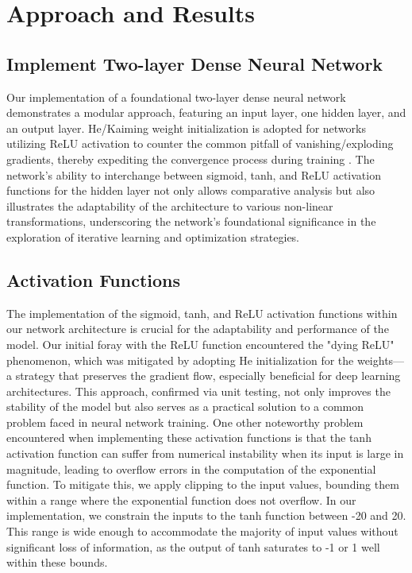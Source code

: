 \documentclass[letterpaper]{article}
\begin{document}
\section{Approach and Results}

\subsection{Implement Two-layer Dense Neural Network}
\label{subsec:twolayerdense}
Our implementation of a foundational two-layer dense neural network demonstrates a modular approach, featuring an input layer, one hidden layer, and an output layer. He/Kaiming weight initialization is adopted for networks utilizing ReLU activation to counter the common pitfall of vanishing/exploding gradients, thereby expediting the convergence process during training \cite{he2015delving}. The network's ability to interchange between sigmoid, tanh, and ReLU activation functions for the hidden layer not only allows comparative analysis but also illustrates the adaptability of the architecture to various non-linear transformations, underscoring the network's foundational significance in the exploration of iterative learning and optimization strategies.

\subsection{Activation Functions}
\label{subsec:activationfunctions}
The implementation of the sigmoid, tanh, and ReLU activation functions within our network architecture is crucial for the adaptability and performance of the model. Our initial foray with the ReLU function encountered the "dying ReLU" phenomenon, which was mitigated by adopting He initialization for the weights—a strategy that preserves the gradient flow, especially beneficial for deep learning architectures. This approach, confirmed via unit testing, not only improves the stability of the model but also serves as a practical solution to a common problem faced in neural network training. One other noteworthy problem encountered when implementing these activation functions is that the tanh activation function can suffer from numerical instability when its input is large in magnitude, leading to overflow errors in the computation of the exponential function. To mitigate this, we apply clipping to the input values, bounding them within a range where the exponential function does not overflow. In our implementation, we constrain the inputs to the tanh function between -20 and 20. This range is wide enough to accommodate the majority of input values without significant loss of information, as the output of tanh saturates to -1 or 1 well within these bounds.
\end{document}
